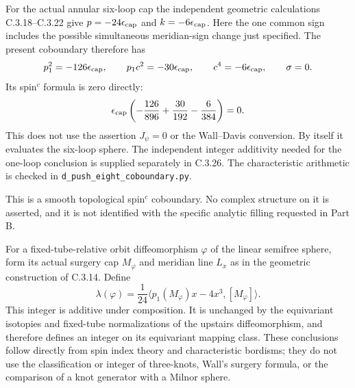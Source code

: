 \begin{remark}
For the actual annular six-loop cap the independent geometric
calculations C.3.18--C.3.22 give
$p=-24\epsilon_{\rm cap}$ and $k=-6\epsilon_{\rm cap}$.
Here the one common sign includes the possible simultaneous
meridian-sign change just specified.
The present coboundary therefore has
\[
 p_1^2=-126\epsilon_{\rm cap},\qquad
 p_1c^2=-30\epsilon_{\rm cap},\qquad
 c^4=-6\epsilon_{\rm cap},\qquad \sigma=0.
\]
Its spin$^c$ formula is zero directly:
\[
 \epsilon_{\rm cap}
 \left(-\frac{126}{896}+\frac{30}{192}
                         -\frac{6}{384}\right)=0.
\]
This does not use the assertion $J_\psi=0$ or the Wall--Davis
conversion. By itself it evaluates the six-loop sphere. The
independent integer additivity needed for the one-loop conclusion
is supplied separately in C.3.26. The characteristic arithmetic
is checked in \texttt{d\_push\_eight\_coboundary.py}.

This is a smooth topological spin$^c$ coboundary. No complex
structure on it is asserted, and it is not identified with the
specific analytic filling requested in Part B.
\end{remark}
\begin{proposition}
For a fixed-tube-relative orbit diffeomorphism $\varphi$ of the
linear semifree sphere, form its actual surgery cap $M_\varphi$
and meridian line $L_x$ as in the geometric construction of
C.3.14. Define
\[
 \lambda(\varphi)=\frac{1}{24}
      \langle p_1(M_\varphi)x-4x^3,[M_\varphi]\rangle.
\]
This integer is additive under composition. It is unchanged by
the equivariant isotopies and fixed-tube normalizations of the
upstairs diffeomorphism, and therefore defines an integer on its
equivariant mapping class. These conclusions follow directly
from spin index theory and characteristic bordisms; they do not
use the classification or integer of three-knots, Wall's surgery
formula, or the comparison of a knot generator with a Milnor sphere.
\end{proposition}

